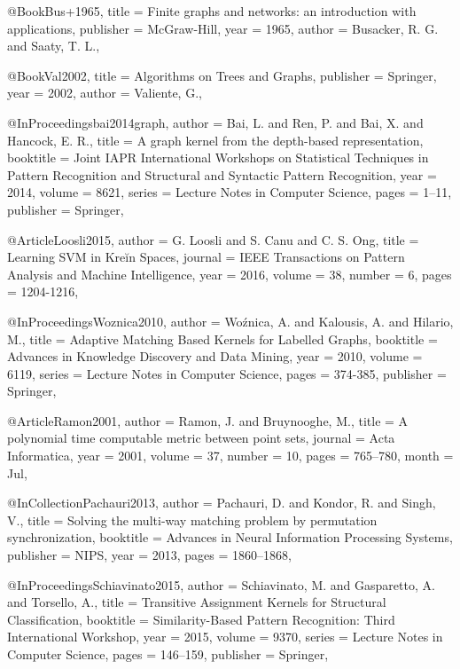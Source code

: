 @Book{Bus+1965,
  title     = {Finite graphs and networks: an introduction with applications},
  publisher = {McGraw-Hill},
  year      = {1965},
  author    = {Busacker, R. G. and Saaty, T. L.},
}

@Book{Val2002,
  title     = {Algorithms on Trees and Graphs},
  publisher = {Springer},
  year      = {2002},
  author    = {Valiente, G.},
}

@InProceedings{bai2014graph,
  author    = {Bai, L. and Ren, P. and Bai, X. and Hancock, E. R.},
  title     = {A graph kernel from the depth-based representation},
  booktitle = {Joint IAPR International Workshops on Statistical Techniques in Pattern Recognition and Structural and Syntactic Pattern Recognition},
  year      = {2014},
  volume    = {8621},
  series    = {Lecture Notes in Computer Science},
  pages     = {1--11},
  publisher = {Springer},
}

@Article{Loosli2015,
  author  = {G. {Loosli} and S. {Canu} and C. S. {Ong}},
  title   = {Learning SVM in Kreĭn Spaces},
  journal = {IEEE Transactions on Pattern Analysis and Machine Intelligence},
  year    = {2016},
  volume  = {38},
  number  = {6},
  pages   = {1204-1216},
}

@InProceedings{Woznica2010,
  author    = {Woźnica, A. and Kalousis, A. and Hilario, M.},
  title     = {Adaptive Matching Based Kernels for Labelled Graphs},
  booktitle = {Advances in Knowledge Discovery and Data Mining},
  year      = {2010},
  volume    = {6119},
  series    = {Lecture Notes in Computer Science},
  pages     = {374-385},
  publisher = {Springer},
}

@Article{Ramon2001,
  author  = {Ramon, J. and Bruynooghe, M.},
  title   = {A polynomial time computable metric between point sets},
  journal = {Acta Informatica},
  year    = {2001},
  volume  = {37},
  number  = {10},
  pages   = {765--780},
  month   = {Jul},
}

@InCollection{Pachauri2013,
  author    = {Pachauri, D. and Kondor, R. and Singh, V.},
  title     = {Solving the multi-way matching problem by permutation synchronization},
  booktitle = {Advances in Neural Information Processing Systems},
  publisher = {NIPS},
  year      = {2013},
  pages     = {1860--1868},
}

@InProceedings{Schiavinato2015,
  author    = {Schiavinato, M. and Gasparetto, A. and Torsello, A.},
  title     = {Transitive Assignment Kernels for Structural Classification},
  booktitle = {Similarity-Based Pattern Recognition: Third International Workshop},
  year      = {2015},
  volume    = {9370},
  series    = {Lecture Notes in Computer Science},
  pages     = {146--159},
  publisher = {Springer},
}

